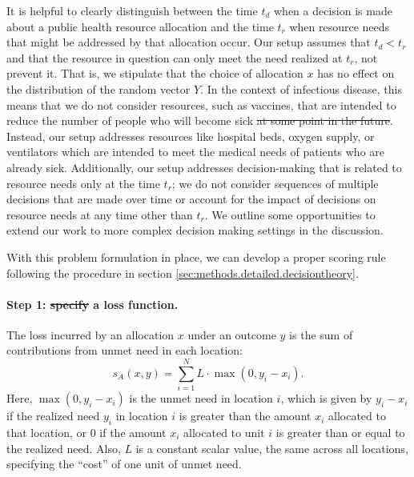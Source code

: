 \documentclass{article}\usepackage[]{graphicx}\usepackage[]{xcolor}
\providecommand{\DIFaddtex}[1]{{\protect\color{blue}\uwave{#1}}} %
\providecommand{\DIFdeltex}[1]{{\protect\color{red}\sout{#1}}}                      %
\providecommand{\DIFaddbegin}{} %
\providecommand{\DIFaddend}{} %
\providecommand{\DIFdelbegin}{} %
\providecommand{\DIFdelend}{} %
\providecommand{\DIFadd}[1]{\texorpdfstring{\DIFaddtex{#1}}{#1}} %
\providecommand{\DIFdel}[1]{\texorpdfstring{\DIFdeltex{#1}}{}} %
\newcommand{\DIFscaledelfig}{0.5}
\newlength{\DIFdelgraphicswidth} %
\newlength{\DIFdelgraphicsheight} %
\newcommand{\DIFaddincludegraphics}[2][]{{\color{blue}\fbox{\DIFOincludegraphics[#1]{#2}}}} %
\newcommand{\DIFdelincludegraphics}[2][]{%
\sbox{\DIFdelgraphicsbox}{\DIFOincludegraphics[#1]{#2}}%
\settoboxwidth{\DIFdelgraphicswidth}{\DIFdelgraphicsbox} %
\settoboxtotalheight{\DIFdelgraphicsheight}{\DIFdelgraphicsbox} %
\scalebox{\DIFscaledelfig}{%
\parbox[b]{\DIFdelgraphicswidth}{\usebox{\DIFdelgraphicsbox}\\[-\baselineskip] \rule{\DIFdelgraphicswidth}{0em}}\llap{\resizebox{\DIFdelgraphicswidth}{\DIFdelgraphicsheight}{%
\setlength{\unitlength}{\DIFdelgraphicswidth}%
\begin{picture}(1,1)%
\thicklines\linethickness{2pt} %
{\color[rgb]{1,0,0}\put(0,0){\framebox(1,1){}}}%
{\color[rgb]{1,0,0}\put(0,0){\line( 1,1){1}}}%
{\color[rgb]{1,0,0}\put(0,1){\line(1,-1){1}}}%
\end{picture}%
}\hspace*{3pt}}} %
} %
\DeclareRobustCommand{\DIFaddbegin}{\DIFOaddbegin \let\includegraphics\DIFaddincludegraphics} %
\DeclareRobustCommand{\DIFaddend}{\DIFOaddend \let\includegraphics\DIFOincludegraphics} %
\DeclareRobustCommand{\DIFdelbegin}{\DIFOdelbegin \let\includegraphics\DIFdelincludegraphics} %
\DeclareRobustCommand{\DIFdelend}{\DIFOaddend \let\includegraphics\DIFOincludegraphics} %
\begin{document}
It is helpful to clearly distinguish between the time $t_d$ when a decision is made about a public health
resource allocation and the time $t_r$ when resource needs that might be addressed by that allocation occur. Our
setup assumes that $t_d < t_r$ and that the resource in question can only meet the need realized at $t_r$, not prevent
it. That is, we stipulate that the choice of allocation $x$ has no effect on the distribution of the random vector $Y$. In the
context of infectious disease, this means that we do not consider resources, such as vaccines, that are intended to
reduce the number of people who will become sick \DIFdelbegin \DIFdel{at some point in the future}\DIFdelend \DIFaddbegin \DIFadd{within the forecast horizon}\DIFaddend . Instead, our setup addresses resources
like hospital beds, oxygen supply, or ventilators which are intended to meet the medical needs of patients who are
already sick. Additionally, our setup addresses decision-making that is related to resource needs only at the time
$t_r$; we do not consider sequences of multiple decisions that are made over time or account for the impact of decisions
on resource needs at any time other than $t_r$. We outline some opportunities to extend our work to more complex
decision making settings in the discussion.

With this problem formulation in place, we can develop a proper scoring rule following the procedure in section
\ref{sec:methods.detailed.decisiontheory}.

\paragraph{Step 1: \DIFdelbegin \DIFdel{specify }\DIFdelend \DIFaddbegin \DIFadd{Specify }\DIFaddend a loss function.} The loss incurred by an allocation $x$ under an outcome $y$ is the sum of
contributions from unmet need in each location:
\begin{equation}
  s_A(x, y) = \sum_{i=1}^N L \cdot \max(0, y_i - x_i). \label{eqn:loss_fn}
\end{equation}
Here, $\max(0, y_i - x_i)$ is the unmet need in location $i$, which is given by $y_i - x_i$ if the realized need $y_i$
in location $i$ is greater than the amount $x_i$ allocated to that location, or $0$ if the amount $x_i$ allocated to
unit $i$ is greater than or equal to the realized need. Also, $L$ is a constant scalar value, the same across all
locations, specifying the ``cost'' of one unit of unmet need.
\end{document}
